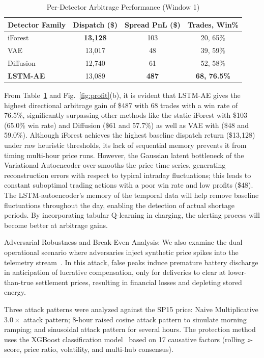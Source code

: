 \documentclass[journal]{IEEEtran}
\begin{document}
\begin{table}[!t]
\centering
\caption{Per-Detector Arbitrage Performance (Window 1)}
\label{tab:perdetector}
\footnotesize
\renewcommand{\arraystretch}{1.12}
\setlength{\tabcolsep}{2.5pt}
\begin{tabular*}{\columnwidth}{@{\extracolsep{\fill}}lccc@{}}
\toprule
\textbf{Detector Family} & \textbf{Dispatch (\$)} & \textbf{Spread PnL (\$)} & \textbf{Trades, Win\%} \\
\midrule
 iForest & \textbf{13,128} & 103 & 20, 65\% \\
 VAE & 13,017 & 48 & 39, 59\% \\
 Diffusion & 12,740 & 61 & 52, 58\% \\
\textbf{LSTM-AE} & 13,089 & \textbf{487} & \textbf{68, 76.5\%} \\
\bottomrule
\end{tabular*}
\end{table}

From Table~\ref{tab:perdetector} and Fig.~\ref{fig:profit}(b), it is evident that LSTM-AE gives the highest directional arbitrage gain of \$487 with 68 trades with a win rate of 76.5\%, significantly surpassing other methods like the static iForest with \$103 (65.0\% win rate) and Diffusion (\$61 and 57.7\%) as well as VAE with (\$48 and 59.0\%). Although iForest achieves the highest baseline dispatch return (\$13,128) under raw heuristic thresholds, its lack of sequential memory prevents it from timing multi-hour price runs. However, the Gaussian latent bottleneck of the Variational Autoencoder over-smooths the price time series, generating reconstruction errors with respect to typical intraday fluctuations; this leads to constant suboptimal trading actions with a poor win rate and low profits (\$48). The LSTM-autoencoder's memory of the temporal data will help remove baseline fluctuations throughout the day, enabling the detection of actual shortage periods. By incorporating tabular Q-learning in charging, the alerting process will become better at arbitrage gains.

Adversarial Robustness and Break-Even Analysis: We also examine the dual operational scenario where adversaries inject synthetic price spikes into the telemetry stream~\cite{Kurt_FDI_Detection}. In this attack, false peaks induce premature battery discharge in anticipation of lucrative compensation, only for deliveries to clear at lower-than-true settlement prices, resulting in financial losses and depleting stored energy.

Three attack patterns were analyzed against the SP15 price: Naive Multiplicative $3.0 \times$ attack pattern; 8-hour raised cosine attack pattern to simulate morning ramping; and sinusoidal attack pattern for several hours. The protection method uses the XGBoost classification model~\cite{XGBoost} based on 17 causative factors (rolling $z$-score, price ratio, volatility, and multi-hub consensus).
\end{document}
